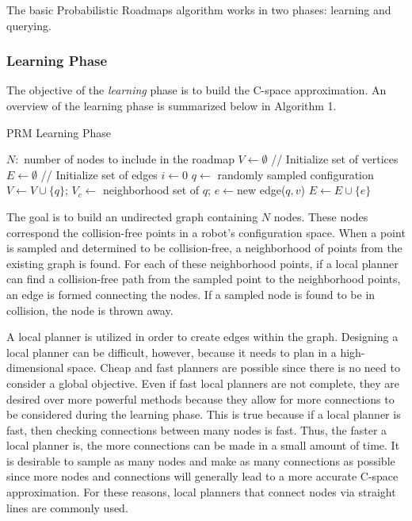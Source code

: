 \documentclass[10pt,conference]{ieeeconf}
\begin{document}
The basic Probabilistic Roadmaps algorithm \cite{PRM} works in two phases: learning and querying. 

\subsubsection{Learning Phase}

The objective of the \emph{learning} phase is to build the C-space approximation. An overview of the learning phase is summarized below in Algorithm 1.

\begin{algorithm}
\caption{PRM Learning Phase}
\begin{algorithmic}[1]
\State $N: $ number of nodes to include in the roadmap
\State $V \leftarrow \emptyset$ // Initialize set of vertices
\State $E \leftarrow \emptyset$ // Initialize set of edges
\State $i \leftarrow 0$
\State $q \leftarrow $ randomly sampled configuration
	\State $V \leftarrow V \cup \{q\}$;
	\State $V_c \leftarrow $ neighborhood set of $q$;
			\State $e \leftarrow $new edge($q,v$)
			\State $E \leftarrow E \cup \{e\}$
		\EndIf
	\EndFor
\EndIf
\EndWhile
\end{algorithmic}
\end{algorithm}

The goal is to build an undirected graph containing $N$ nodes. These nodes correspond the collision-free points in a robot's configuration space. When a point is sampled and determined to be collision-free, a neighborhood of points from the existing graph is found. For each of these neighborhood points, if a local planner can find a collision-free path from the sampled point to the neighborhood points, an edge is formed connecting the nodes. If a sampled node is found to be in collision, the node is thrown away.  

A local planner is utilized in order to create edges within the graph. Designing a local planner can be difficult, however, because it needs to plan in a high-dimensional space. Cheap and fast planners are possible since there is no need to consider a global objective. Even if fast local planners are not complete, they are desired over more powerful methods because they allow for more connections to be considered during the learning phase. This is true because if a local planner is fast, then checking connections between many nodes is fast. Thus, the faster a local planner is, the more connections can be made in a small amount of time. It is desirable to sample as many nodes and make as many connections as possible since more nodes and connections will generally lead to a more accurate C-space approximation. For these reasons, local planners that connect nodes via straight lines are commonly used.
\end{document}
